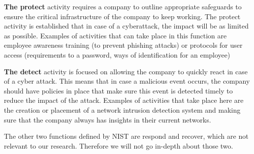 \textbf{The protect}
 activity requires a company to outline appropriate safeguards to ensure the critical infrastructure of the company to keep working. The protect activity is established that in case of a cyberattack, the impact will be as limited as possible. Examples of activities that can take place in this function are employee awareness training (to prevent phishing attacks) or protocols for user access (requirements to a password, ways of identification for an employee)



\textbf{The detect}
 activity is focused on allowing the company to quickly react in case of a cyber attack. This means that in case a malicious event occurs, the company should have policies in place that make sure this event is detected timely to reduce the impact of the attack. Examples of activities that take place here are the creation or placement of a network intrusion detection system and making sure that the company always has insights in their current networks.


The other two functions defined by NIST are respond and recover, which are not relevant to our research. Therefore we will not go in-depth about those two.

